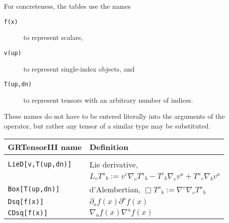 \documentclass{article}
\begin{document}
{{{For concreteness, the tables use the names
\begin{description}
  \item[\texttt{f(x)}] to represent scalars,
  \item[\texttt{v(up)}] to represent single-index objects, and
  \item[\texttt{T(up,dn)}] to represent tensors with an arbitrary number
    of indices.
\end{description}
These names do not have to be entered literally into the arguments of
the operator, but rather any tensor of a similar type may be substituted.\\

\renewcommand{\baselinestretch}{1.5}\normalsize
\begin{center}
\begin{tabular}{lp{}}\hline\hline
GRTensorIII name & Definition\\ \hline
& \\
\texttt{LieD[v,T(up,dn)]}	& Lie derivative,\\
			 	& $L_v T^a{}_b := v^c \nabla_c T^a{}_b
				-T^c{}_b\nabla_c v^a + T^a{}_c\nabla_b v^a$ \\
\texttt{Box[T(up,dn)]}		& d'Alembertian, 
				$\Box T^a{}_b := \nabla^c \nabla_c T^a{}_b$\\
\texttt{Dsq[f(x)]}		& $\partial_a f(x) \partial^a f(x)$\\
\texttt{CDsq[f(x)]}		& $\nabla_a f(x) \nabla^a f(x)$\\
\hline
\end{tabular}
\renewcommand{\baselinestretch}{1}\normalsize
\end{center}

}}}
\end{document}

